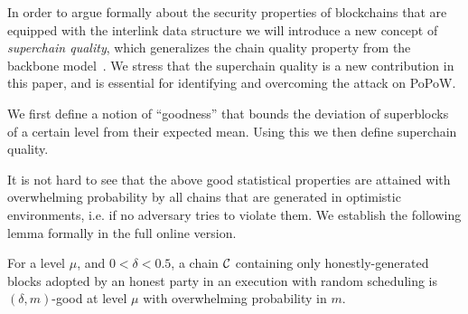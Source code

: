 %




In order to argue formally about the security
properties of blockchains that are equipped with the interlink
data structure we will introduce a new concept of {\em superchain quality},
which generalizes the chain quality property from the backbone model~\cite{backbone}.
We stress that the superchain quality is a new contribution in this paper, and is essential for identifying and overcoming the attack on PoPoW.

We first define a notion of ``goodness'' that bounds the deviation
of superblocks of a certain level from their expected mean. Using
this we then define superchain quality.

It is not hard to see that the above good statistical properties are attained
with overwhelming probability by all chains that are generated in optimistic
environments, i.e. if no adversary tries to violate them.
We establish the following lemma formally in the full online version.
\begin{lemma}
\label{lem.superchain-distribution}
For a level $\mu$, and $0 < \delta < 0.5$, a chain
$\mathcal{C}$ containing only honestly-generated blocks adopted by an honest party in
an execution with random scheduling is $(\delta, m)$-good at level
$\mu$ with overwhelming probability in $m$.
\end{lemma}
